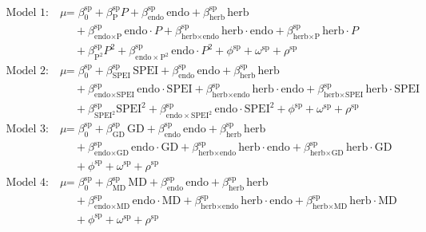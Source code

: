 \documentclass[12pt]{article}\usepackage[]{graphicx}\usepackage[dvipsnames]{xcolor}
\begin{document}
\begin{equation}\label{eq:candidates}
\begin{aligned}
\text{Model 1:} \quad 
\mu &= \beta_{0}^{\text{sp}} + \beta_{\text{P}}^{\text{sp}} P + \beta_{\text{endo}}^{\text{sp}}\,\text{endo} + \beta_{\text{herb}}^{\text{sp}}\,\text{herb} \\
&\quad + \beta_{\text{endo} \times \text{P}}^{\text{sp}}\,\text{endo} \cdot P 
+ \beta_{\text{herb} \times \text{endo}}^{\text{sp}}\,\text{herb} \cdot \text{endo} 
+ \beta_{\text{herb} \times \text{P}}^{\text{sp}}\,\text{herb} \cdot P \\
&\quad + \beta_{\text{P}^2}^{\text{sp}} P^2 + \beta_{\text{endo} \times \text{P}^2}^{\text{sp}}\,\text{endo} \cdot P^2 
+ \phi^{\text{sp}} + \omega^{\text{sp}} + \rho^{\text{sp}} \\
\text{Model 2:} \quad 
\mu &= \beta_{0}^{\text{sp}} + \beta_{\text{SPEI}}^{\text{sp}}\,\text{SPEI} + \beta_{\text{endo}}^{\text{sp}}\,\text{endo} + \beta_{\text{herb}}^{\text{sp}}\,\text{herb} \\
&\quad + \beta_{\text{endo} \times \text{SPEI}}^{\text{sp}}\,\text{endo} \cdot \text{SPEI} 
+ \beta_{\text{herb} \times \text{endo}}^{\text{sp}}\,\text{herb} \cdot \text{endo} 
+ \beta_{\text{herb} \times \text{SPEI}}^{\text{sp}}\,\text{herb} \cdot \text{SPEI} \\
&\quad + \beta_{\text{SPEI}^2}^{\text{sp}} \text{SPEI}^2 
+ \beta_{\text{endo} \times \text{SPEI}^2}^{\text{sp}}\,\text{endo} \cdot \text{SPEI}^2 
+ \phi^{\text{sp}} + \omega^{\text{sp}} + \rho^{\text{sp}} \\
\text{Model 3:} \quad 
\mu &= \beta_{0}^{\text{sp}} + \beta_{\text{GD}}^{\text{sp}}\,\text{GD} + \beta_{\text{endo}}^{\text{sp}}\,\text{endo} + \beta_{\text{herb}}^{\text{sp}}\,\text{herb} \\
&\quad + \beta_{\text{endo} \times \text{GD}}^{\text{sp}}\,\text{endo} \cdot \text{GD} 
+ \beta_{\text{herb} \times \text{endo}}^{\text{sp}}\,\text{herb} \cdot \text{endo} 
+ \beta_{\text{herb} \times \text{GD}}^{\text{sp}}\,\text{herb} \cdot \text{GD} \\
&\quad + \phi^{\text{sp}} + \omega^{\text{sp}} + \rho^{\text{sp}} \\
\text{Model 4:} \quad 
\mu &= \beta_{0}^{\text{sp}} + \beta_{\text{MD}}^{\text{sp}}\,\text{MD} + \beta_{\text{endo}}^{\text{sp}}\,\text{endo} + \beta_{\text{herb}}^{\text{sp}}\,\text{herb} \\
&\quad + \beta_{\text{endo} \times \text{MD}}^{\text{sp}}\,\text{endo} \cdot \text{MD} 
+ \beta_{\text{herb} \times \text{endo}}^{\text{sp}}\,\text{herb} \cdot \text{endo} 
+ \beta_{\text{herb} \times \text{MD}}^{\text{sp}}\,\text{herb} \cdot \text{MD} \\
&\quad + \phi^{\text{sp}} + \omega^{\text{sp}} + \rho^{\text{sp}}
\end{aligned}
\end{equation}
\end{document}
